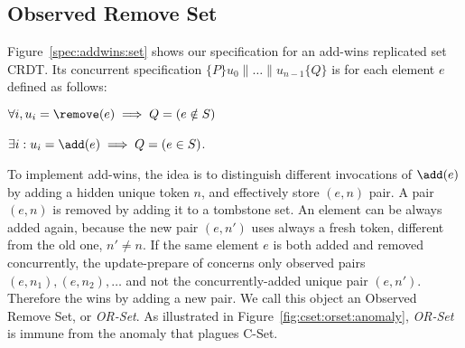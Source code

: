 \documentclass[a4paper]{article}
\begin{document}
\subsection{Observed Remove Set}




Figure~\ref{spec:addwins:set} shows our specification for an add-wins
replicated set CRDT\@.
Its concurrent specification 
$ \{ P \}  u_{0} \parallel \ldots{} \parallel u_{n-1}  \{ Q \}$
is for each element $e$ defined as follows:
\begin{compactitem}
\item
  $\forall i, u_{i} = \remove(e) \implies Q = (e \notin S)$
\item
  $\exists i: u_{i} = \add(e) \implies Q = (e \in S)$.
\end{compactitem}

To implement add-wins, the idea is to distinguish different invocations of
$\add(e)$ by adding a hidden unique token $n$, and effectively store $(e,
n)$ pair.  A pair $(e, n)$ is removed by adding it to a tombstone set.  An
element can be always added again, because the new pair $(e, n')$ uses
always a fresh token, different from the old one, $n' \ne n$.  If the same
element $e$ is both added and removed concurrently, the update-prepare of
\remove concerns only observed pairs $(e, n_1), (e, n_2), \ldots$ and not
the concurrently-added unique pair $(e, n')$.  Therefore the \add wins by
adding a new pair.  We call this object an Observed Remove Set, or
\emph{OR-Set}.  As illustrated in Figure~\ref{fig:cset:orset:anomaly},
\emph{OR-Set} is immune from the anomaly that plagues {C-Set}.
\end{document}
